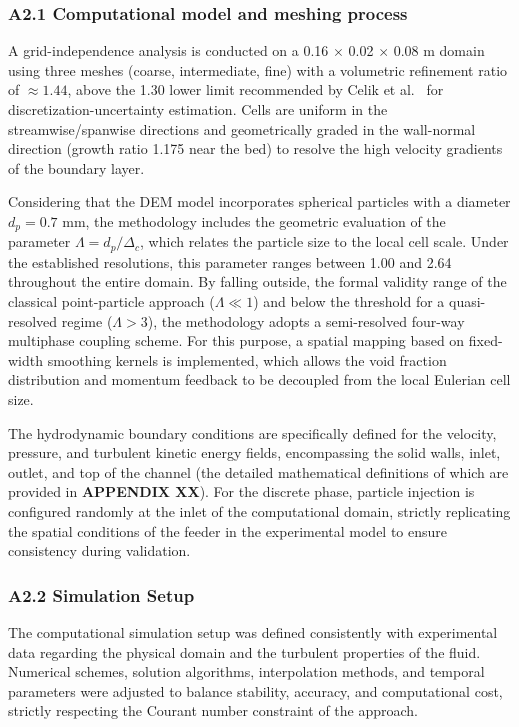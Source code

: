 \subsubsection{A2.1 Computational model and meshing process}

A grid-independence analysis is conducted on a 0.16 $\times$ 0.02 $\times$ 0.08 m domain using three meshes (coarse, intermediate, fine) with a volumetric refinement ratio of ${\approx}1.44$, above the 1.30 lower limit recommended by Celik et al.\ \cite{PEND_Celik2008} for discretization-uncertainty estimation. Cells are uniform in the streamwise/spanwise directions and geometrically graded in the wall-normal direction (growth ratio 1.175 near the bed) to resolve the high velocity gradients of the boundary layer.

Considering that the DEM model incorporates spherical particles with a diameter \(d_{p} = 0.7\) mm, the methodology includes the geometric evaluation of the parameter \(\Lambda = d_{p}/\Delta_{c}\), which relates the particle size to the local cell scale. Under the established resolutions, this parameter ranges between 1.00 and 2.64 throughout the entire domain. By falling outside, the formal validity range of the classical point-particle approach (\(\Lambda \ll 1\)) and below the threshold for a quasi-resolved regime (\(\Lambda > 3\)), the methodology adopts a semi-resolved four-way multiphase coupling scheme. For this purpose, a spatial mapping based on fixed-width smoothing kernels is implemented, which allows the void fraction distribution and momentum feedback to be decoupled from the local Eulerian cell size.

The hydrodynamic boundary conditions are specifically defined for the velocity, pressure, and turbulent kinetic energy fields, encompassing the solid walls, inlet, outlet, and top of the channel (the detailed mathematical definitions of which are provided in \textbf{APPENDIX XX}). For the discrete phase, particle injection is configured randomly at the inlet of the computational domain, strictly replicating the spatial conditions of the feeder in the experimental model to ensure consistency during validation.

\subsubsection{A2.2 Simulation Setup}

The computational simulation setup was defined consistently with experimental data regarding the physical domain and the turbulent properties of the fluid. Numerical schemes, solution algorithms, interpolation methods, and temporal parameters were adjusted to balance stability, accuracy, and computational cost, strictly respecting the Courant number constraint of the approach.

